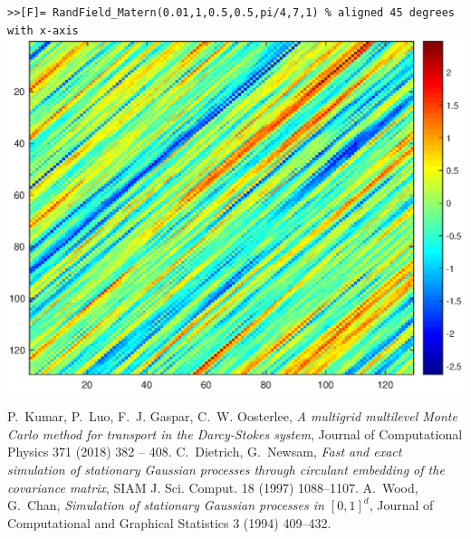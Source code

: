\documentclass{extarticle}
\begin{document}
\texttt{>>[F]= RandField\_Matern(0.01,1,0.5,0.5,pi/4,7,1) \% aligned 45 degrees with x-axis}\\
\centering
\includegraphics[scale=0.4]{f4.eps}\\


\begin{thebibliography}{10}
P.~Kumar, P.~Luo, F.~J. Gaspar, C.~W. Oosterlee, \textit{A multigrid multilevel
  Monte Carlo method for transport in the Darcy-Stokes system}, Journal of
  Computational Physics 371 (2018) 382 -- 408.  
C.~{Dietrich}, G.~{Newsam}, \textit{Fast and exact simulation of stationary
  Gaussian processes through circulant embedding of the covariance matrix},
  SIAM J. Sci. Comput. 18 (1997) 1088--1107.
A.~{Wood}, G.~{Chan}, \textit{Simulation of stationary Gaussian processes in
  $[0, 1]^d$}, Journal of Computational and Graphical Statistics 3 (1994)
  409--432.
\end{thebibliography}
\end{document}
